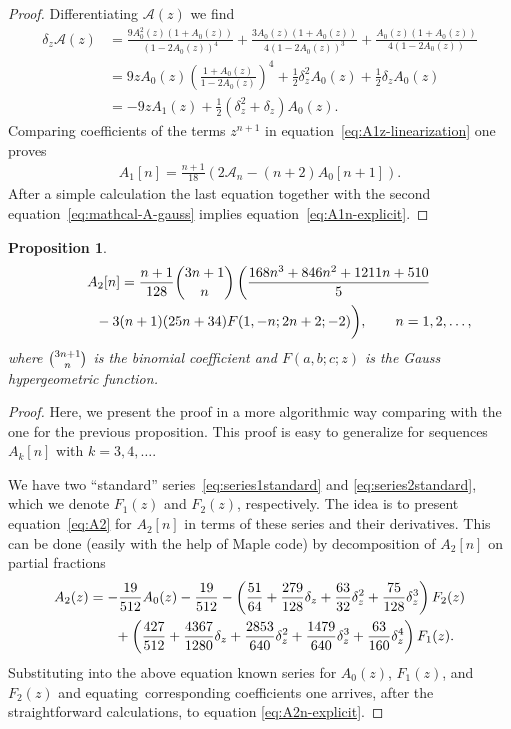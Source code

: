 \documentclass[pdftex]{sigma}
\numberwithin{equation}{section}
\newtheorem{Proposition}[Theorem]{Proposition}
 { \theoremstyle{definition}
\newtheorem{Remark}[Theorem]{Remark} }
\begin{document}
\begin{proof}
Differentiating $\mathcal{A}(z)$ we find
\begin{align}
\delta_z\mathcal{A}(z)&=\frac{9A_0^2(z)(1+A_0(z))}{(1-2A_0(z))^4}+\frac{3A_0(z)(1+A_0(z))}{4(1-2A_0(z))^3}
+\frac{A_0(z)(1+A_0(z))}{4(1-2A_0(z))}\nonumber\\
&=9zA_0(z)\left(\frac{1+A_0(z)}{1-2A_0(z)}\right)^4+\frac12\delta_z^2A_0(z)+\frac12\delta_zA_0(z)\nonumber\\
&=-9zA_1(z)+\frac12(\delta_z^2+\delta_z)A_0(z).\label{eq:A1z-linearization}
\end{align}
Comparing coefficients of the terms $z^{n+1}$ in equation~\eqref{eq:A1z-linearization} one proves
\begin{gather*}
A_1[n]=\frac{n+1}{18}\left(2\mathcal{A}_n-(n+2)A_0[n+1]\right).
\end{gather*}
After a simple calculation the last equation together with the second equation~\eqref{eq:mathcal-A-gauss} implies equation~\eqref{eq:A1n-explicit}.
\end{proof}
\begin{Proposition}
\begin{gather}
A_2[n] =\frac{n+1}{128}\dbinom{3n+1}{n}\left(\frac{168n^3+846n^2+1211n+510}5\right.\nonumber\\
\hphantom{A_2[n] =}{} -3(n+1)(25n+34)F(1,-n;2n+2;-2)\bigg),\qquad n=1,2,\ldots,\label{eq:A2n-explicit}
\end{gather}
where $\tbinom{3n+1}{n}$ is the binomial coefficient and $F(a,b;c;z)$ is the Gauss hypergeometric function.
\end{Proposition}
\begin{proof}Here, we present the proof in a more algorithmic way comparing with the one for the previous proposition.
This proof is easy to generalize for sequences $A_k[n]$ with $k=3,4,\ldots$.

We have two ``standard'' series~\eqref{eq:series1standard} and \eqref{eq:series2standard}, which we denote
$F_1(z)$ and $F_2(z)$, respectively. The idea is to present equation~\eqref{eq:A2} for $A_2[n]$ in terms of these series and their derivatives.
This can be done (easily with the help of Maple code) by decomposition of $A_2[n]$ on partial fractions
\begin{gather*}
A_2(z)=-\frac{19}{512}A_0(z)-\frac{19}{512}-\left(\frac{51}{64}+\frac{279}{128}\delta_z+
\frac{63}{32}\delta_z^2+\frac{75}{128}\delta_z^3\right)F_2(z)\\
\hphantom{A_2(z)=}{}+\left(\frac{427}{512}+\frac{4367}{1280}\delta_z+\frac{2853}{640}\delta_z^2+\frac{1479}{640}\delta_z^3
+\frac{63}{160}\delta_z^4\right)F_1(z).
\end{gather*}
Substituting  into the above equation known series for $A_0(z)$, $F_1(z)$, and $F_2(z)$ and equa\-ting~corres\-ponding coefficients one arrives, after the straightforward calculations, to equa\-tion \eqref{eq:A2n-explicit}.
\end{proof}
\end{document}
